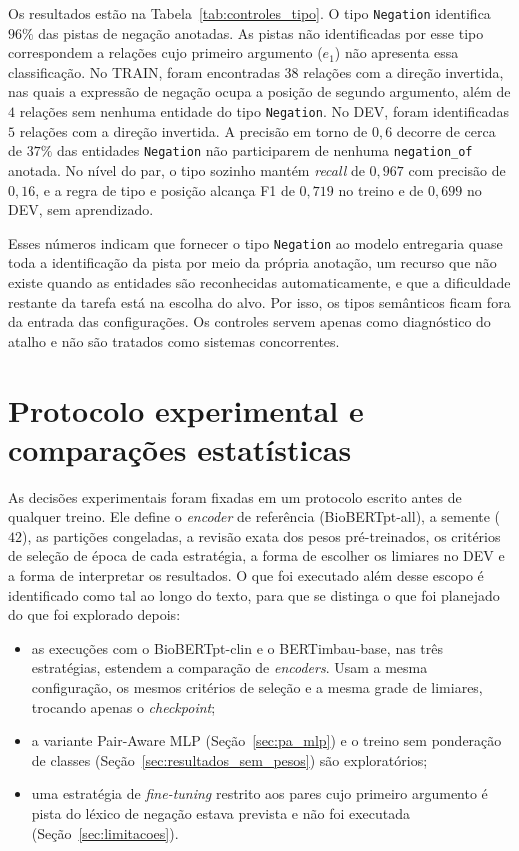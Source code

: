 

Os resultados estão na Tabela~\ref{tab:controles_tipo}. O tipo \texttt{Negation} identifica $96\%$ das pistas de negação anotadas. As pistas não identificadas por esse tipo correspondem a relações cujo primeiro argumento ($e_1$) não apresenta essa classificação. No TRAIN, foram encontradas $38$ relações com a direção invertida, nas quais a expressão de negação ocupa a posição de segundo argumento, além de $4$ relações sem nenhuma entidade do tipo \texttt{Negation}. No DEV, foram identificadas $5$ relações com a direção invertida. A precisão em torno de $0{,}6$
decorre de cerca de $37\%$ das entidades \texttt{Negation} não participarem de
nenhuma \texttt{negation\_of} anotada. No nível do par, o tipo sozinho mantém
\emph{recall} de $0{,}967$ com precisão de $0{,}16$, e a regra de tipo e posição
alcança F1 de $0{,}719$ no treino e de $0{,}699$ no DEV, sem aprendizado.

Esses números indicam que fornecer o tipo \texttt{Negation} ao modelo entregaria
quase toda a identificação da pista por meio da própria anotação, um recurso que não
existe quando as entidades são reconhecidas automaticamente, e que a dificuldade
restante da tarefa está na escolha do alvo. Por isso, os tipos semânticos ficam fora
da entrada das configurações. Os controles servem apenas como diagnóstico do atalho e
não são tratados como sistemas concorrentes.

\section{Protocolo experimental e comparações estatísticas}
\label{sec:protocolo}

As decisões experimentais foram fixadas em um protocolo escrito antes de qualquer
treino. Ele define o \emph{encoder} de referência (BioBERTpt-all), a semente ($42$),
as partições congeladas, a revisão exata dos pesos pré-treinados, os critérios de
seleção de época de cada estratégia, a forma de escolher os limiares no DEV e a
forma de interpretar os resultados. O que foi executado além desse escopo é
identificado como tal ao longo do texto, para que se distinga o que foi planejado
do que foi explorado depois:

\begin{itemize}
  \item as execuções com o BioBERTpt-clin e o BERTimbau-base, nas três estratégias,
        estendem a comparação de \emph{encoders}. Usam a mesma configuração, os
        mesmos critérios de seleção e a mesma grade de limiares, trocando apenas o
        \emph{checkpoint};
  \item a variante Pair-Aware MLP (Seção~\ref{sec:pa_mlp}) e o treino sem
        ponderação de classes (Seção~\ref{sec:resultados_sem_pesos}) são
        exploratórios;
  \item uma estratégia de \emph{fine-tuning} restrito aos pares cujo primeiro
        argumento é pista do léxico de negação estava prevista e não foi executada
        (Seção~\ref{sec:limitacoes}).
\end{itemize}

